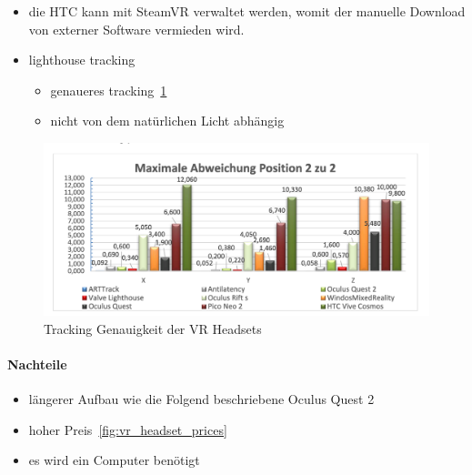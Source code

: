 \begin{itemize}
    \item die HTC kann mit SteamVR verwaltet werden, womit der manuelle Download von externer Software vermieden wird.
    \item lighthouse tracking
    \begin{itemize}
        \item genaueres tracking~\ref{fig:tracking_precision_statistic}
        \item nicht von dem natürlichen Licht abhängig~\cite{Dennis_Ziesecke_2019}
    \end{itemize}
\end{itemize}

\begin{figure}
    \centering
    \includegraphics[scale=0.4]{pics/tracking_precision_statistic}
    \caption{Tracking Genauigkeit der VR Headsets~\cite{Macedo_2020}}
    \label{fig:tracking_precision_statistic}
\end{figure}

\paragraph{Nachteile}

\begin{itemize}
    \item längerer Aufbau wie die Folgend beschriebene Oculus Quest 2
    \item hoher Preis~\ref{fig:vr_headset_prices}
    \item es wird ein Computer benötigt
\end{itemize}

